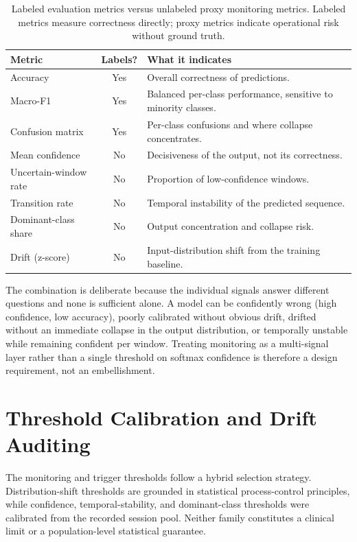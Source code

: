 \renewcommand{\arraystretch}{1.2}
\begin{table}[htbp]
\centering
\footnotesize
\caption[Labeled evaluation metrics versus unlabeled proxy monitoring metrics]{Labeled evaluation metrics versus unlabeled proxy monitoring metrics. Labeled metrics
measure correctness directly; proxy metrics indicate operational risk without ground truth.}
\label{tab:metrics_labeled_unlabeled}
\begin{tabularx}{\textwidth}{p{3.2cm} c X}
\toprule
\textbf{Metric} & \textbf{Labels?} & \textbf{What it indicates} \\
\midrule
Accuracy & Yes & Overall correctness of predictions. \\
Macro-F1 & Yes & Balanced per-class performance, sensitive to minority classes. \\
Confusion matrix & Yes & Per-class confusions and where collapse concentrates. \\
\midrule
Mean confidence & No & Decisiveness of the output, not its correctness. \\
Uncertain-window rate & No & Proportion of low-confidence windows. \\
Transition rate & No & Temporal instability of the predicted sequence. \\
Dominant-class share & No & Output concentration and collapse risk. \\
Drift (z-score) & No & Input-distribution shift from the training baseline. \\
\bottomrule
\end{tabularx}
\renewcommand{\arraystretch}{1.0}
\end{table}

The combination is deliberate because the individual signals answer different questions and none is
sufficient alone. A model can be confidently wrong (high confidence, low accuracy), poorly calibrated
without obvious drift, drifted without an immediate collapse in the output distribution, or temporally
unstable while remaining confident per window. Treating monitoring as a multi-signal layer rather than
a single threshold on softmax confidence is therefore a design requirement, not an embellishment.

\section{Threshold Calibration and Drift Auditing}
\label{sec:threshold_scope}

The monitoring and trigger thresholds follow a hybrid selection strategy. Distribution-shift
thresholds are grounded in statistical process-control principles, while confidence,
temporal-stability, and dominant-class thresholds were calibrated from the recorded session pool.
Neither family constitutes a clinical limit or a population-level statistical guarantee.

